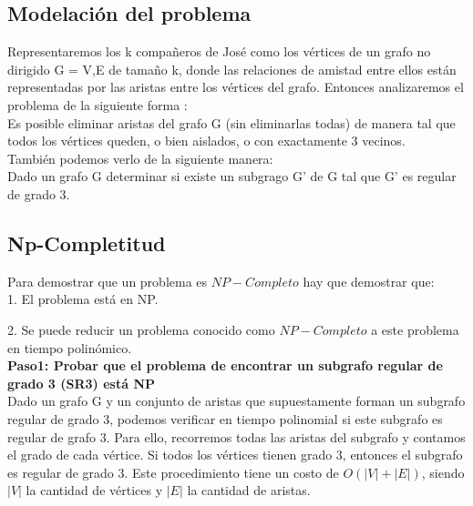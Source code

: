 \documentclass[
10pt, %
a4paper, %
oneside, %
headinclude,footinclude, %
BCOR5mm, %
]{scrartcl}
\begin{document}


\subsection{Modelación del problema}

Representaremos los k compañeros de José como los vértices de un grafo no dirigido G = {V,E} de tamaño k, donde las relaciones de amistad entre ellos están representadas
por las aristas entre los vértices del grafo. Entonces analizaremos el problema de la siguiente forma :\\

Es posible eliminar aristas del grafo G (sin eliminarlas todas) de manera tal que todos los vértices queden, o bien aislados, o con exactamente 3 vecinos. \\

También podemos verlo de la siguiente manera: \\

Dado un grafo G determinar si existe un subgrago G' de G tal que G' es regular de grado 3.\\


\subsection{Np-Completitud}

Para demostrar que un problema es $NP-Completo$ hay que demostrar que:\\

1. El problema está en NP.

2. Se puede reducir un problema conocido como $NP-Completo$ a este problema en tiempo polinómico.\\

\textbf{Paso1: Probar que el problema de encontrar un subgrafo regular de grado 3 (SR3) está NP }\\


Dado un grafo G y un conjunto de aristas que supuestamente forman un subgrafo regular de grado 3, podemos verificar en 
tiempo polinomial si este subgrafo es regular de grafo 3. Para ello, recorremos todas las aristas del subgrafo y contamos el grado de
cada vértice. Si todos los vértices tienen grado 3, entonces el subgrafo es regular de grado 3. Este procedimiento tiene un costo de 
$O(|V|+|E|)$, siendo $|V|$ la cantidad de vértices y $|E|$ la cantidad de aristas.\\
\end{document}
